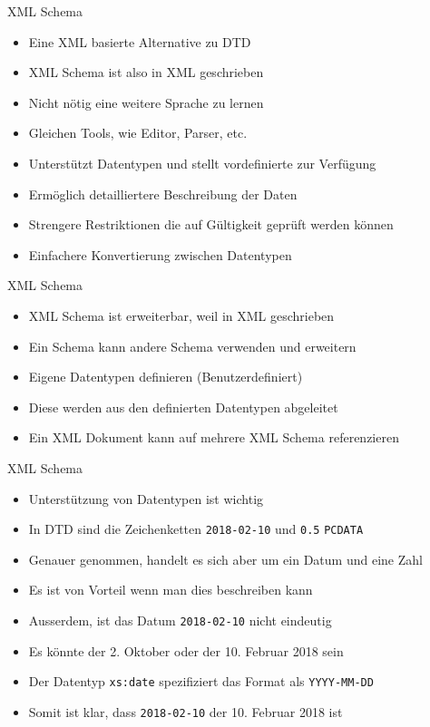 \documentclass{beamer}
\begin{document}
\begin{frame}{XML Schema}
	
	\begin{itemize}
		\item Eine XML basierte Alternative zu DTD
		\item XML Schema ist also in XML geschrieben
		\item Nicht nötig eine weitere Sprache zu lernen
		\item Gleichen Tools, wie Editor, Parser, etc.
		\item Unterstützt Datentypen und stellt vordefinierte zur Verfügung
		\item Ermöglich detailliertere Beschreibung der Daten
		\item Strengere Restriktionen die auf Gültigkeit geprüft werden können
		\item Einfachere Konvertierung zwischen Datentypen
	\end{itemize}
	
\end{frame}

\begin{frame}{XML Schema}
	
	\begin{itemize}
		\item XML Schema ist erweiterbar, weil in XML geschrieben
		\item Ein Schema kann andere Schema verwenden und erweitern
		\item Eigene Datentypen definieren (Benutzerdefiniert)
		\item Diese werden aus den definierten Datentypen abgeleitet
		\item Ein XML Dokument kann auf mehrere XML Schema referenzieren
	\end{itemize}
	
\end{frame}

\begin{frame}{XML Schema}
	
	\begin{itemize}
		\item Unterstützung von Datentypen ist wichtig
		\item In DTD sind die Zeichenketten \texttt{2018-02-10} und \texttt{0.5} \texttt{PCDATA}
		\item Genauer genommen, handelt es sich aber um ein Datum und eine Zahl
		\item Es ist von Vorteil wenn man dies beschreiben kann
		\item Ausserdem, ist das Datum \texttt{2018-02-10} nicht eindeutig
		\item Es könnte der 2. Oktober oder der 10. Februar 2018 sein
		\item Der Datentyp \texttt{xs:date} spezifiziert das Format als \texttt{YYYY-MM-DD}
		\item Somit ist klar, dass \texttt{2018-02-10} der 10. Februar 2018 ist
	\end{itemize}
	
\end{frame}
\end{document}
